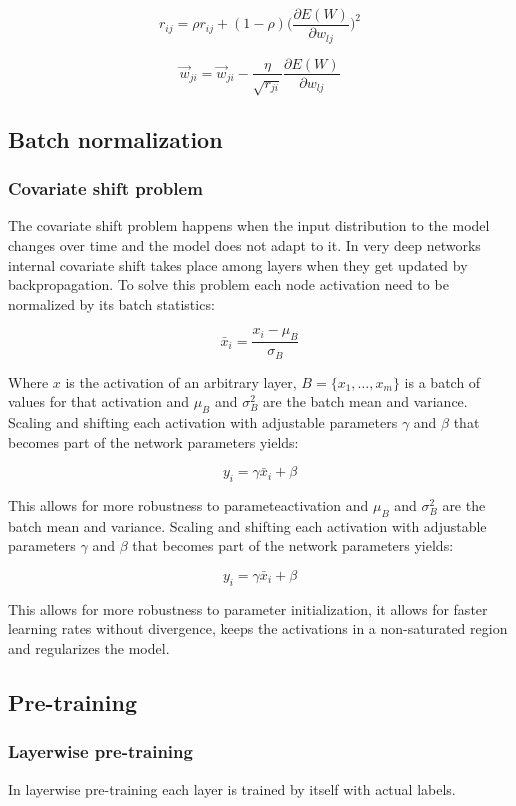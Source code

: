 		$$r_{ij} = \rho r_{ij} + (1-\rho)\biggl(\frac{\partial E(W)}{\partial w_{lj}}\biggr)^2$$

		$$\vec{w}_{ji} = \vec{w}_{ji} -\frac{\eta}{\sqrt{r_{ji}}}\frac{\partial E(W)}{\partial w_{lj}}$$

	\subsection{Batch normalization}

		\subsubsection{Covariate shift problem}
		The covariate shift problem happens when the input distribution to the model changes over time and the model does not adapt to it.
		In very deep networks internal covariate shift takes place among layers when they get updated by backpropagation.
		To solve this problem each node activation need to be normalized by its batch statistics:

		$$\bar{x}_i = \frac{x_i-\mu_B}{\sigma_B}$$

		Where $x$ is the activation of an arbitrary layer, $B = \{x_1, \dots, x_m\}$ is a batch of values for that activation and $\mu_B$ and $\sigma^2_B$ are the batch mean and variance.
		Scaling and shifting each activation with adjustable parameters $\gamma$ and $\beta$ that becomes part of the network parameters yields:

		$$y_i = \gamma\bar{x}_i+\beta$$

		This allows for more robustness to parameteactivation and $\mu_B$ and $\sigma^2_B$ are the batch mean and variance.
		Scaling and shifting each activation with adjustable parameters $\gamma$ and $\beta$ that becomes part of the network parameters yields:

		$$y_i = \gamma\bar{x}_i+\beta$$

		This allows for more robustness to parameter initialization, it allows for faster learning rates without divergence, keeps the activations in a non-saturated region and regularizes the model.

	\subsection{Pre-training}

		\subsubsection{Layerwise pre-training}
		In layerwise pre-training each layer is trained by itself with actual labels.

